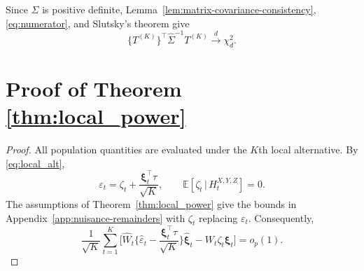 \documentclass[12pt]{article}
\def\E{\mathbb{E}}
\newcommand\given{\,|\,}
\numberwithin{equation}{section}
\begin{document}
Since \(\Sigma\) is positive definite, Lemma~\ref{lem:matrix-covariance-consistency},
\eqref{eq:numerator}, and Slutsky's theorem give
\[
\{T^{(K)}\}^\top\hat\Sigma^{-1}T^{(K)}
\xrightarrow{d}\chi_d^2.
\]


 
\section{Proof of Theorem \ref{thm:local_power}}
\label{app:local-power-proof}

\begin{proof}
All population quantities are evaluated under the \(K\)th local
alternative. By \eqref{eq:local_alt},
\[
\varepsilon_t=\zeta_t+\frac{\boldsymbol\xi_t^\top\tau}{\sqrt K},\qquad
\E[\zeta_t\given H_t^{X,Y,Z}]=0.
\]
The assumptions of Theorem~\ref{thm:local_power} give the bounds in
Appendix~\ref{app:nuisance-remainders} with \(\zeta_t\) replacing
\(\varepsilon_t\). Consequently,
\begin{equation}
\label{eq:local-centred-remainder}
\frac1{\sqrt K}\sum_{t=1}^K
\Big[\hat W_t\Big\{\hat\varepsilon_t-
\frac{\boldsymbol\xi_t^\top\tau}{\sqrt K}\Big\}
\hat{\boldsymbol\xi}_t-W_t\zeta_t\boldsymbol\xi_t\Big]
=o_p(1).
\end{equation}


\end{proof}
\end{document}
